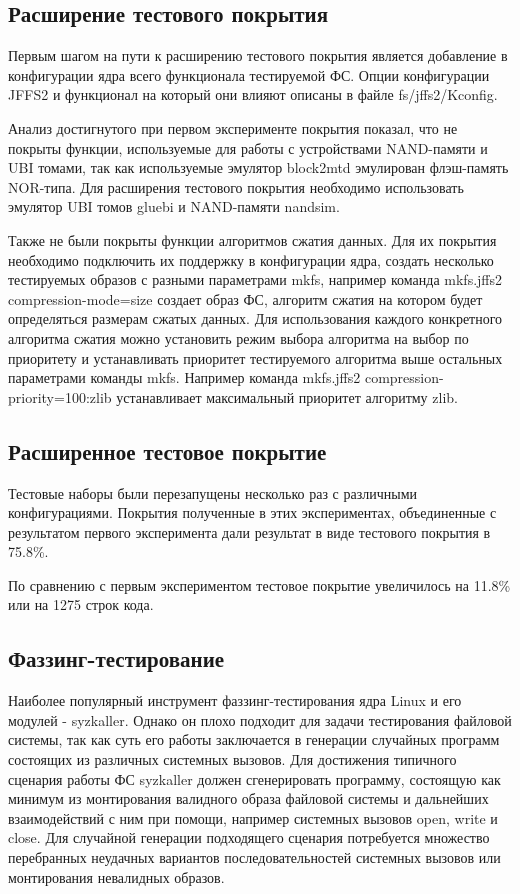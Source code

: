 \subsection{Расширение тестового покрытия}

Первым шагом на пути к расширению тестового покрытия является добавление в конфигурации ядра всего функционала тестируемой ФС. Опции конфигурации JFFS2 и функционал на который они влияют описаны в файле fs/jffs2/Kconfig.

Анализ достигнутого при первом эксперименте покрытия показал, что не покрыты функции, используемые для работы с устройствами NAND-памяти и UBI томами, так как используемые эмулятор block2mtd эмулирован флэш-память NOR-типа. Для расширения тестового покрытия необходимо использовать эмулятор UBI томов gluebi и NAND-памяти nandsim.

Также не были покрыты функции алгоритмов сжатия данных. Для их покрытия необходимо подключить их поддержку в конфигурации ядра, создать несколько тестируемых образов с разными параметрами mkfs, например команда mkfs.jffs2 \-\-compression-mode=size создает образ ФС, алгоритм сжатия на котором будет определяться размерам сжатых данных. Для использования каждого конкретного алгоритма сжатия можно установить режим выбора алгоритма на выбор по приоритету и устанавливать приоритет тестируемого алгоритма выше остальных параметрами команды mkfs. Например команда mkfs.jffs2 \-\-compression-priority=100:zlib устанавливает максимальный приоритет алгоритму zlib.

\subsection{Расширенное тестовое покрытие}

Тестовые наборы были перезапущены несколько раз с различными конфигурациями. Покрытия полученные в этих экспериментах, объединенные с результатом первого эксперимента дали результат в виде тестового покрытия в 75.8\%.

По сравнению с первым экспериментом тестовое покрытие увеличилось на 11.8\% или на 1275 строк кода.

\subsection{Фаззинг-тестирование}

Наиболее популярный инструмент фаззинг-тестирования ядра Linux и его модулей - syzkaller. Однако он плохо подходит для задачи тестирования файловой системы, так как суть его работы заключается в генерации случайных программ состоящих из различных системных вызовов. Для достижения типичного сценария работы ФС syzkaller должен сгенерировать программу, состоящую как минимум из монтирования валидного образа файловой системы и дальнейших взаимодействий с ним при помощи, например системных вызовов open, write и close. Для случайной генерации подходящего сценария потребуется множество перебранных неудачных вариантов последовательностей системных вызовов или монтирования невалидных образов.

